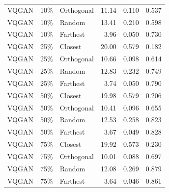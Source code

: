 \begin{longtable}{lllrrr}
VQGAN & 10\% & Orthogonal & 11.14 & 0.110 & 0.537 \\
VQGAN & 10\% & Random & 13.41 & 0.210 & 0.598 \\
VQGAN & 10\% & Farthest & 3.96 & 0.050 & 0.730 \\
VQGAN & 25\% & Closest & 20.00 & 0.579 & 0.182 \\
VQGAN & 25\% & Orthogonal & 10.66 & 0.098 & 0.614 \\
VQGAN & 25\% & Random & 12.83 & 0.232 & 0.749 \\
VQGAN & 25\% & Farthest & 3.74 & 0.050 & 0.790 \\
VQGAN & 50\% & Closest & 19.98 & 0.579 & 0.206 \\
VQGAN & 50\% & Orthogonal & 10.41 & 0.096 & 0.655 \\
VQGAN & 50\% & Random & 12.53 & 0.258 & 0.823 \\
VQGAN & 50\% & Farthest & 3.67 & 0.049 & 0.828 \\
VQGAN & 75\% & Closest & 19.92 & 0.573 & 0.230 \\
VQGAN & 75\% & Orthogonal & 10.01 & 0.088 & 0.697 \\
VQGAN & 75\% & Random & 12.08 & 0.269 & 0.879 \\
VQGAN & 75\% & Farthest & 3.64 & 0.046 & 0.861 \\
\end{longtable}
\endgroup

